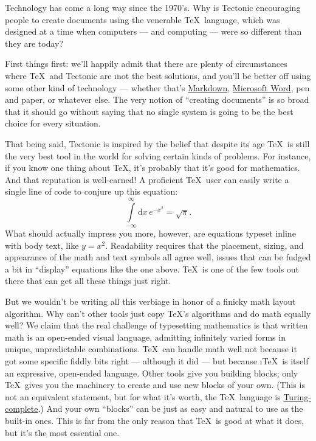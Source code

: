 
Technology has come a long way since the 1970's. Why is Tectonic encouraging
people to create documents using the venerable \TeX\ language, which was
designed at a time when computers — and computing — were so different than they
are today?

First things first: we'll happily admit that there are plenty of circumstances
where \TeX\ and Tectonic are \i{not} the best solutions, and you'll be better off
using some other kind of technology — whether that's
\href{https://en.wikipedia.org/wiki/Markdown}{Markdown},
\href{https://www.microsoft.com/en-us/microsoft-365/word}{Microsoft Word}, pen
and paper, or whatever else. The very notion of “creating documents” is so broad
that it should go without saying that no single system is going to be the best
choice for every situation.

That being said, Tectonic is inspired by the belief that despite its age \TeX\
is still the very best tool in the world for solving certain kinds of problems.
For instance, if you know one thing about \TeX, it's probably that it's good for
mathematics. And that reputation is well-earned! A proficient \TeX\ user can
easily write a single line of code to conjure up this equation:
\[
\int\limits_{-\infty}^{\infty} \text{d}x \, e^{-x^{2}} = \sqrt{\pi}.
\]
What should actually impress you more, however, are equations typeset inline
with body text, like $y = x^2$. Readability requires that the placement, sizing,
and appearance of the math and text symbols all agree well, issues that can be
fudged a bit in “display” equations like the one above. \TeX\ is one of the few
tools out there that can get all these things just right.

But we wouldn't be writing all this verbiage in honor of a finicky math layout
algorithm. Why can't other tools just copy \TeX's algorithms and do math equally
well? We claim that the real challenge of typesetting mathematics is that
written math is an open-ended visual language, admitting infinitely varied forms
in unique, unpredictable combinations. \TeX\ can handle math well not because it
got some specific fiddly bits right — although it did — but because \i{\TeX\ is
itself an expressive, open-ended language}. Other tools give you building
blocks; only \TeX\ gives you the machinery to create and use new blocks of your
own. (This is not an equivalent statement, but for what it’s worth, the \TeX\
language is
\href{https://en.wikipedia.org/wiki/Turing_completeness}{Turing-complete}.) And
your own “blocks” can be just as easy and natural to use as the built-in ones.
This is far from the only reason that \TeX\ is good at what it does, but it's
the most essential one.

